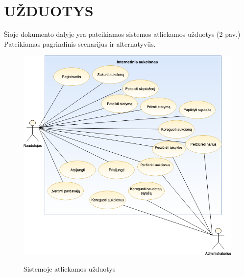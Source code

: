 \documentclass{VUMIFPSkursinis}
\begin{document}
	\newpage
	\newpage
	\section{UŽDUOTYS}
	Šioje dokumento dalyje yra pateikiamos sistemos atliekamos užduotys  (2 pav.) Pateikiamas pagrindinis scenarijus ir alternatyvūs.
	\begin{figure}[H]
		\centering
		\includegraphics[width=\linewidth]{img/UseCaseDiagram.png}
		\label{fig:usecase}
		\caption{Sistemoje atliekamos užduotys}
	\end{figure}
\end{document}
